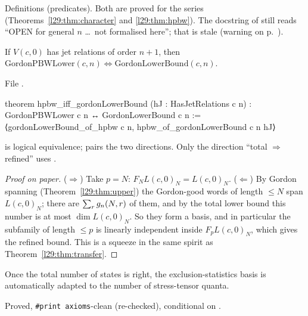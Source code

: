 \begin{status}
Definitions (predicates). Both are proved for the series (Theorems~\ref{l29:thm:character} and
\ref{l29:thm:hpbw}). The docstring of  still reads ``OPEN for general $n$ \dots\ not formalised
here''; that is stale (warning on p.~\pageref{l29:warn:stale}).
\end{status}

\begin{theorem}\label{l29:thm:hpbwiff}
If $V(c,0)$ has jet relations of order $n+1$, then $\mathrm{GordonPBWLower}(c,n)\iff\mathrm{GordonLowerBound}(c,n)$.
\end{theorem}

\noindent File .
\begin{leancode}
theorem hpbw_iff_gordonLowerBound (hJ : HasJetRelations c n) :
    GordonPBWLower c n ↔ GordonLowerBound c n :=
  ⟨gordonLowerBound_of_hpbw c n, hpbw_of_gordonLowerBound c n hJ⟩
\end{leancode}

\begin{dictionary}
 is logical equivalence;  pairs the two directions. Only the direction ``total $\Rightarrow$
refined'' uses .
\end{dictionary}

\begin{proof}[Proof on paper]
($\Rightarrow$) Take $p=N$: $F_NL(c,0)_N=L(c,0)_N$. ($\Leftarrow$) By Gordon spanning (Theorem~\ref{l29:thm:upper})
the Gordon-good words of length $\le N$ span $L(c,0)_N$; there are $\sum_rg_n(N,r)$ of them, and by the
total lower bound this number is at most $\dim L(c,0)_N$. So they form a basis, and in particular the subfamily of
length $\le p$ is linearly independent inside $F_pL(c,0)_N$, which gives the refined bound. This is a squeeze in the
same spirit as Theorem~\ref{l29:thm:transfer}.
\end{proof}

\begin{physics}
Once the total number of states is right, the exclusion-statistics basis is automatically adapted to the number of
stress-tensor quanta.
\end{physics}

\begin{status}
Proved, \texttt{\#print axioms}-clean (re-checked), conditional on .
\end{status}

